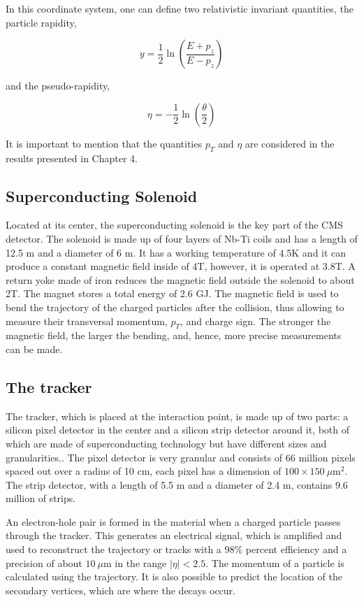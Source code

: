 In this coordinate system, one can define two relativistic invariant quantities, the particle rapidity,

\begin{equation}
y = \frac{1}{2}\ln\left(\frac{E+p_z}{E-p_z}\right)
\end{equation}

and the pseudo-rapidity,

\begin{equation}
\eta = -\frac{1}{2}\ln\left(\frac{\theta}{2}\right)
\end{equation}

It is important to mention that the quantities $p_T$ and $\eta$ are considered in the results presented in Chapter 4.

\subsection{Superconducting Solenoid}
Located at its center, the superconducting solenoid is the key part of the CMS detector. The solenoid is made up of four layers of Nb-Ti coils and has a length of 12.5 m and a diameter of 6 m. It has a working temperature of 4.5K and it can produce a constant magnetic field inside of 4T, however, it is operated at 3.8T. A return yoke made of iron reduces the magnetic field outside the solenoid to about 2T. The magnet stores a total energy of 2.6 GJ. The magnetic field is used to bend the trajectory of the charged particles after the collision, thus allowing to measure their transversal momentum, $p_T$, and charge sign. The stronger the magnetic field, the larger the bending, and, hence, more precise measurements can be made.
\subsection{The tracker}
The tracker, which is placed at the interaction point, is made up of two parts: a silicon pixel detector in the center and a silicon strip detector around it, both of which are made of superconducting technology but have different sizes and granularities.\cite{sanchez2020search}. The pixel detector is very granular and consists of 66 million pixels spaced out over a radius of 10 cm, each pixel has a dimension of $100 \times 150 \ \mu \text{m}^2$. The strip detector, with a length of 5.5 m and a diameter of 2.4 m, contains 9.6 million of strips. 

An electron-hole pair is formed in the material when a charged particle passes through the tracker. This generates an electrical signal, which is amplified and used to reconstruct the trajectory or tracks with a 98$\%$ percent efficiency and a precision of about $10 \ \mu$m in the range $|\eta| < 2.5$. The momentum of a particle is calculated using the trajectory. It is also possible to predict the location of the secondary vertices, which are where the decays occur.
